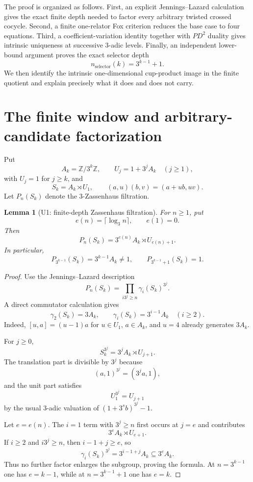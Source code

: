 \documentclass[11pt]{article}
\newtheorem{lemma}[theorem]{Lemma}
\begin{document}
The proof is organized as follows. First, an explicit
Jennings--Lazard calculation gives the exact finite depth needed to
factor every arbitrary twisted crossed cocycle. Second, a finite
one-relator Fox criterion reduces the base case to four equations.
Third, a coefficient-variation identity together with $PD^2$ duality
gives intrinsic uniqueness at successive $3$-adic levels. Finally, an
independent lower-bound argument proves the exact selector depth
\[
n_{\mathrm{selector}}(k)=3^{k-1}+1.
\]
We then identify the intrinsic one-dimensional cup-product image in the
finite quotient and explain precisely what it does and does not carry.

\section{The finite window and arbitrary-candidate factorization}

Put
\[
A_k=\mathbb Z/3^k\mathbb Z,\qquad
U_j=1+3^jA_k\quad(j\ge1),
\]
with $U_j=1$ for $j\ge k$, and
\[
S_k=A_k\rtimes U_1,\qquad
(a,u)(b,v)=(a+ub,uv).
\]
Let $P_n(S_k)$ denote the $3$-Zassenhaus filtration.

\begin{lemma}[U1: finite-depth Zassenhaus filtration]
For $n\ge1$, put
\[
e(n)=\lceil\log_3 n\rceil,\qquad e(1)=0.
\]
Then
\[
\boxed{
P_n(S_k)=3^{e(n)}A_k\rtimes U_{e(n)+1}.
}
\]
In particular,
\[
P_{3^{k-1}}(S_k)=3^{k-1}A_k\ne1,
\qquad
P_{3^{k-1}+1}(S_k)=1.
\]
\end{lemma}

\begin{proof}
Use the Jennings--Lazard description
\[
P_n(S_k)=\prod_{i3^j\ge n}\gamma_i(S_k)^{3^j}.
\]
A direct commutator calculation gives
\[
\gamma_2(S_k)=3A_k,\qquad
\gamma_i(S_k)=3^{i-1}A_k\quad(i\ge2).
\]
Indeed, $[u,a]=(u-1)a$ for $u\in U_1$, $a\in A_k$, and
$u=4$ already generates $3A_k$.

For $j\ge0$,
\[
S_k^{3^j}=3^jA_k\rtimes U_{j+1}.
\]
The translation part is divisible by $3^j$ because
\[
(a,1)^{3^j}=(3^ja,1),
\]
and the unit part satisfies
\[
U_1^{3^j}=U_{j+1}
\]
by the usual $3$-adic valuation of
$(1+3^sb)^{3^j}-1$.

Let $e=e(n)$. The $i=1$ term with $3^j\ge n$ first occurs at
$j=e$ and contributes
\[
3^eA_k\rtimes U_{e+1}.
\]
If $i\ge2$ and $i3^j\ge n$, then
$i-1+j\ge e$, so
\[
\gamma_i(S_k)^{3^j}
=3^{i-1+j}A_k
\subseteq3^eA_k.
\]
Thus no further factor enlarges the subgroup, proving the formula.
At $n=3^{k-1}$ one has $e=k-1$, while at
$n=3^{k-1}+1$ one has $e=k$.
\end{proof}
\end{document}
